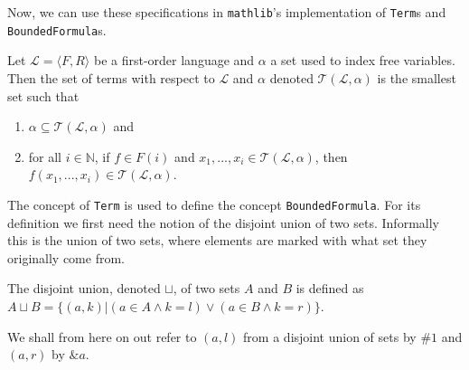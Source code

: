Now, we can use these specifications in \texttt{mathlib}'s implementation of \texttt{Term}s and \texttt{BoundedFormula}s.

\begin{definition}\label{def:FO-Term}
  \leanok
    Let $\mathcal{L} = \langle F, R \rangle$ be a first-order language and $\alpha$ a set used to index free variables. Then the set of terms with respect to $\mathcal{L}$ and $\alpha$ denoted $\mathcal{T}(\mathcal{L},\alpha)$ is the smallest set such that
        \begin{enumerate}
            \item $\alpha \subseteq \mathcal{T}(\mathcal{L},\alpha)$ and
            \item for all $i \in \mathbb{N}$, if $f \in F(i)$ and $x_1,...,x_i \in \mathcal{T}(\mathcal{L},\alpha)$, then $f(x_1,...,x_i) \in \mathcal{T}(\mathcal{L},\alpha)$.
        \end{enumerate}
\end{definition}

The concept of \texttt{Term} is used to define the concept \texttt{BoundedFormula}. For its definition we first need the notion of the disjoint union of two sets. Informally this is the union of two sets, where elements are marked with what set they originally come from.
\begin{definition}\label{def:Disjoint-Union}
  \leanok
  The disjoint union, denoted $\sqcup$, of two sets $A$ and $B$ is defined as $A \sqcup B = \{(a,k) | (a \in A \wedge k = l) \vee (a \in B \wedge k = r)\}$.
\end{definition}
We shall from here on out refer to $(a,l)$ from a disjoint union of sets by $\#1$ and $(a,r)$ by $\&a$. 

